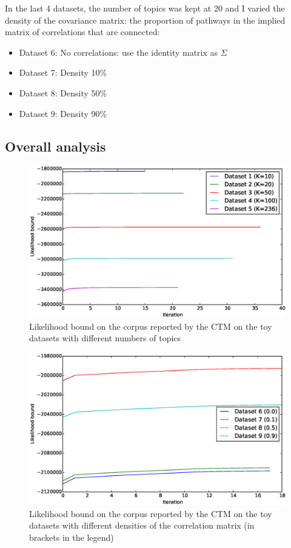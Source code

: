 \documentclass[12pt,a4paper,twoside,openright]{report}
\begin{document}
In the last 4 datasets, the number of topics was kept at 20 and I varied the density of the covariance matrix: the proportion of pathways in the implied matrix of correlations that are connected:

\begin{itemize}[noitemsep]
\item Dataset 6: No correlations: use the identity matrix as $\Sigma$
\item Dataset 7: Density 10\%
\item Dataset 8: Density 50\%
\item Dataset 9: Density 90\%
\end{itemize}

\subsection{Overall analysis}

\begin{figure}[!htb]
\includegraphics[width=\textwidth]{sim-likelihood-bounds-1-5.eps}
\caption{Likelihood bound on the corpus reported by the CTM on the toy datasets with different numbers of topics}
\label{fig:sim-likelihood-bounds-1-5}
\end{figure}

\begin{figure}[!htb]
\includegraphics[width=\textwidth]{sim-likelihood-bounds-6-9.eps}
\caption{Likelihood bound on the corpus reported by the CTM on the toy datasets with different densities of the correlation matrix (in brackets in the legend)}
\label{fig:sim-likelihood-bounds-6-9}
\end{figure}
\end{document}
